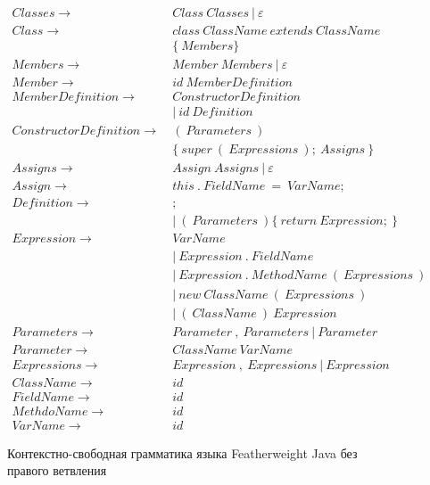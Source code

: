 \begin{figure}[htb]
    \begin{align*}
        Classes \rightarrow&\ Class\ Classes\ |\ \varepsilon\\
        Class \rightarrow&\ class\ ClassName\ extends\ ClassName\\
        &\ \{\ Members \}\\
        Members \rightarrow&\ Member\ Members\ |\ \varepsilon\\
        Member \rightarrow&\ id\ MemberDefinition\\
        MemberDefinition \rightarrow&\ ConstructorDefinition\\
        &\ |\ id\ Definition\\
        ConstructorDefinition \rightarrow&\ (\ Parameters\ )\\
        &\ \{\ super\ (\ Expressions\ );\ Assigns\ \}\\
        Assigns \rightarrow&\ Assign\ Assigns\ |\ \varepsilon\\
        Assign \rightarrow&\ this\ .\ FieldName\ =\ VarName;\\
        Definition \rightarrow&\ ;\\
        &\ |\ (\ Parameters\ ) \{\ return\ Expression;\ \}\\
        Expression \rightarrow&\ VarName\\
        &\ |\ Expression\ .\ FieldName\\
        &\ |\ Expression\ .\ MethodName\ (\ Expressions\ )\\
        &\ |\ new\ ClassName\ (\ Expressions\ )\\
        &\ |\ (\ ClassName\ )\ Expression\\
        Parameters \rightarrow&\ Parameter\ ,\ Parameters\ |\ Parameter\\
        Parameter \rightarrow&\ ClassName\ VarName\\
        Expressions \rightarrow&\ Expression\ ,\ Expressions\ |\ Expression\\
        ClassName \rightarrow&\ id\\
        FieldName \rightarrow&\ id\\
        MethdoName \rightarrow&\ id\\
        VarName \rightarrow&\ id
    \end{align*}
    \caption{Контекстно-свободная грамматика языка Featherweight Java без правого ветвления}
    \label{cf-fj-happy}
\end{figure}
